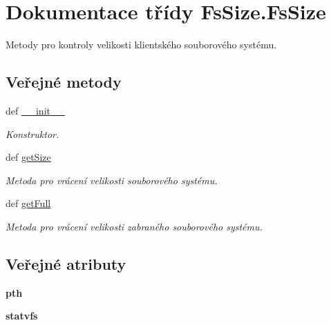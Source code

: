 \hypertarget{classFsSize_1_1FsSize}{\section{Dokumentace třídy Fs\-Size.\-Fs\-Size}
\label{d1/d81/classFsSize_1_1FsSize}
}


Metody pro kontroly velikosti klientského souborového systému.  


\subsection*{Veřejné metody}
\begin{DoxyCompactItemize}
\item 
def \hyperlink{classFsSize_1_1FsSize_a7457d0d8bc7d7dc7c51f72ef8918ddea}{\-\_\-\-\_\-init\-\_\-\-\_\-}
\begin{DoxyCompactList}\small\item\em Konstruktor. \end{DoxyCompactList}\item 
def \hyperlink{classFsSize_1_1FsSize_a988fd81d1518f72d3c93f49c986a0a47}{get\-Size}
\begin{DoxyCompactList}\small\item\em Metoda pro vrácení velikosti souborového systému. \end{DoxyCompactList}\item 
def \hyperlink{classFsSize_1_1FsSize_a4c53593300ce4fabcdf59d74a278fc3a}{get\-Full}
\begin{DoxyCompactList}\small\item\em Metoda pro vrácení velikosti zabraného souborového systému. \end{DoxyCompactList}\end{DoxyCompactItemize}
\subsection*{Veřejné atributy}
\begin{DoxyCompactItemize}
\item 
\hypertarget{classFsSize_1_1FsSize_af08b961cdfd8a46d5ec0307d96eedcf0}{{\bfseries pth}}\label{d1/d81/classFsSize_1_1FsSize_af08b961cdfd8a46d5ec0307d96eedcf0}

\item 
\hypertarget{classFsSize_1_1FsSize_a9bbcb4f1576e1e453d8a239d0bbe9d41}{{\bfseries statvfs}}\label{d1/d81/classFsSize_1_1FsSize_a9bbcb4f1576e1e453d8a239d0bbe9d41}

\end{DoxyCompactItemize}


